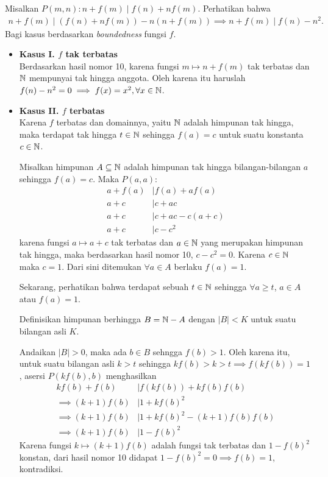 
\begin{solusi}
    Misalkan $P(m,n) : n+f(m) \mid f(n)+nf(m)$. Perhatikan bahwa
    \begin{align*}
        n+f(m) \mid (f(n)+nf(m))-n(n+f(m)) \implies n+f(m) \mid f(n) - n^2.
    \end{align*}
    Bagi kasus berdasarkan \textit{boundedness} fungsi $f$. 
    \begin{itemize}
        \item \textbf{Kasus I. $f$ tak terbatas}\\
        Berdasarkan hasil nomor 10, karena fungsi $m \mapsto n+f(m)$ tak terbatas dan $\mathbb N$ mempunyai tak hingga anggota. Oleh karena itu haruslah $f(n) - n^2 = 0 \implies f(x) = x^2, \forall x \in \mathbb N$. 
        
        \item \textbf{Kasus II. $f$ terbatas}\\
        Karena $f$ terbatas dan domainnya, yaitu $\mathbb N$ adalah himpunan tak hingga, maka terdapat tak hingga $t \in \mathbb N$ sehingga $f(a) = c$ untuk suatu konstanta $c \in \mathbb N$.

        Misalkan himpunan $A \subseteq \mathbb N$ adalah himpunan tak hingga bilangan-bilangan $a$ sehingga $f(a) = c$. Maka $P(a,a):$
        \begin{align*}
            a+f(a) &\mid f(a) + af(a)\\
            a+c &\mid c+ac\\
            a+c &\mid c+ac-c(a+c)\\
            a+c &\mid c-c^2
        \end{align*}
        karena fungsi $a \mapsto a+c$ tak terbatas dan $a \in \mathbb N$ yang merupakan himpunan tak hingga, maka berdasarkan hasil nomor 10, $c-c^2=0$. Karena $c \in \mathbb N$ maka $c=1$. Dari sini ditemukan $\forall a \in A$ berlaku $f(a)=1$.

        Sekarang, perhatikan bahwa terdapat sebuah $t \in \mathbb N$ sehingga $\forall a \ge t$, $a \in A$ atau $f(a)=1$.

        Definisikan himpunan berhingga $B = \mathbb N - A$ dengan $|B|<K$ untuk suatu bilangan asli $K$. 
        
        Andaikan $|B|>0$, maka ada $b \in B$ sehngga $f(b)>1$. Oleh karena itu, untuk suatu bilangan asli $k > t$ sehingga $kf(b)>k>t \implies f(kf(b))=1$, asersi $P(kf(b), b)$ menghasilkan
        \begin{align*}
            kf(b)+f(b) &\mid f(kf(b))+kf(b)f(b)\\ 
            \implies (k+1)f(b) &\mid 1+kf(b)^2\\
            \implies (k+1)f(b) &\mid 1+kf(b)^2-(k+1)f(b)f(b)\\
            \implies (k+1)f(b) &\mid 1-f(b)^2
        \end{align*}
        Karena fungsi $k \mapsto (k+1)f(b)$ adalah fungsi tak terbatas dan $1-f(b)^2$ konstan, dari hasil nomor 10 didapat $1-f(b)^2=0 \implies f(b)=1$, kontradiksi.


\end{itemize}
\end{solusi}
